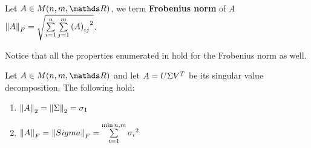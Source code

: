 \documentclass[computational_mathematics.tex]{subfiles}
\begin{document}
\begin{definition}
  Let $A \in M(n, m, \R)$, we term \textbf{Frobenius norm} of $A$ ${\left\lVert A\right\rVert}_F = \sqrt{\sum\limits_{i=1}^n \sum\limits_{j=1}^m {{(A)}_{ij}}^2}$.
\end{definition}

Notice that all the properties enumerated in  hold for the Frobenius norm as well.

\begin{proposition}
  Let $A \in M(n, m, \R)$ and let $A = U \Sigma {V}^{T}$ be its singular value decomposition.
  The following hold:
  \begin{enumerate}
    \item $\left\lVert A\right\rVert_2 = \left\lVert\Sigma\right\rVert_2 = \sigma_1$
    \item $\left\lVert A\right\rVert_F = \left\lVert Sigma\right\rVert_F = \sum\limits_{i=1}^{\min{n, m}} {\sigma_i}^2$
  \end{enumerate}
\end{proposition}
\end{document}
